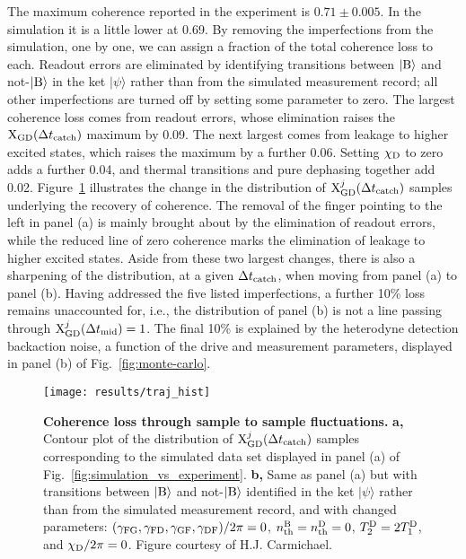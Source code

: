 The maximum coherence reported in the experiment is $0.71\pm0.005$.
In the simulation it is a little lower at 0.69. By removing the imperfections
from the simulation, one by one, we can assign a fraction of the total
coherence loss to each. Readout errors are eliminated by identifying
transitions between $|{\rm B}\rangle$ and not-$|{\rm B}\rangle$
in the ket $|\psi\rangle$ rather than from the simulated measurement
record; all other imperfections are turned off by setting some parameter
to zero. The largest coherence loss comes from readout errors, whose
elimination raises the ${\rm X}_{{\rm GD}}(\Delta t_{{\rm catch}})$
maximum by 0.09. The next largest comes from leakage to higher excited
states, which raises the maximum by a further 0.06. Setting $\chi_{{\rm D}}$
to zero adds a further 0.04, and thermal transitions and pure dephasing
together add 0.02. Figure~\ref{fig:coherence_loss} illustrates the
change in the distribution of ${\rm X}_{{\rm GD}}^{j}(\Delta t_{{\rm catch}})$
samples underlying the recovery of coherence. The removal of the finger
pointing to the left in panel (a) is mainly brought about by the elimination
of readout errors, while the reduced line of zero coherence marks
the elimination of leakage to higher excited states. Aside from these
two largest changes, there is also a sharpening of the distribution,
at a given $\Delta t_{{\rm catch}}$, when moving from panel (a) to
panel (b). Having addressed the five listed imperfections, a further
10\% loss remains unaccounted for, i.e., the distribution of panel
(b) is not a line passing through ${\rm X}_{{\rm GD}}^{j}(\Delta t_{{\rm mid}})=1$.
The final 10\% is explained by the heterodyne detection backaction
noise, a function of the drive and measurement parameters, displayed
in panel (b) of Fig.~\ref{fig:monte-carlo}. 
\begin{figure}[h]
\begin{centering}
\texttt{[image: results/traj\_hist]}
\par\end{centering}
\centering{}\caption[Coherence loss through sample to sample fluctuations (courtesy of
H.J. Carmichael)]{\label{fig:coherence_loss}\textbf{Coherence loss through sample
to sample fluctuations.} \textbf{a,} Contour plot of the distribution
of ${\rm X}_{{\rm GD}}^{j}(\Delta t_{{\rm catch}})$ samples corresponding
to the simulated data set displayed in panel (a) of Fig.~\ref{fig:simulation_vs_experiment}.
\textbf{b,} Same as panel (a) but with transitions between $|{\rm B}\rangle$
and not-$|{\rm B}\rangle$ identified in the ket $|\psi\rangle$ rather
than from the simulated measurement record, and with changed parameters:
$(\gamma_{{\rm FG}},\gamma_{{\rm FD}},\gamma_{{\rm GF}},\gamma_{{\rm DF}})/2\pi=0$,
$n_{{\rm th}}^{{\rm B}}=n_{{\rm th}}^{{\rm D}}=0$, $T_{2}^{{\rm D}}=2T_{1}^{{\rm D}}$,
and $\chi_{{\rm D}}/2\pi=0$. Figure courtesy of H.J. Carmichael.}
\end{figure}


